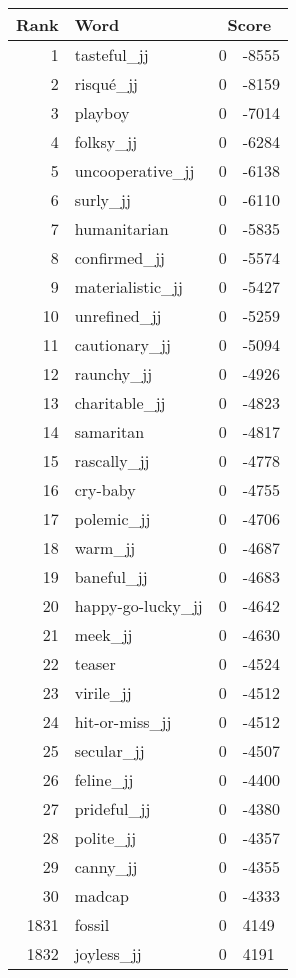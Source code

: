 \begin{longtable}[!htbp]{| rlr@{.}l |}
    \hline
    \textbf{Rank} & \textbf{Word} & \multicolumn{2}{c|}{\textbf{Score}} \\
    \hline
    \endhead
    1 & tasteful\_jj & 0 & -8555 \\
    2 & risqué\_jj & 0 & -8159 \\
    3 & playboy & 0 & -7014 \\
    4 & folksy\_jj & 0 & -6284 \\
    5 & uncooperative\_jj & 0 & -6138 \\
    6 & surly\_jj & 0 & -6110 \\
    7 & humanitarian & 0 & -5835 \\
    8 & confirmed\_jj & 0 & -5574 \\
    9 & materialistic\_jj & 0 & -5427 \\
    10 & unrefined\_jj & 0 & -5259 \\
    11 & cautionary\_jj & 0 & -5094 \\
    12 & raunchy\_jj & 0 & -4926 \\
    13 & charitable\_jj & 0 & -4823 \\
    14 & samaritan & 0 & -4817 \\
    15 & rascally\_jj & 0 & -4778 \\
    16 & cry-baby & 0 & -4755 \\
    17 & polemic\_jj & 0 & -4706 \\
    18 & warm\_jj & 0 & -4687 \\
    19 & baneful\_jj & 0 & -4683 \\
    20 & happy-go-lucky\_jj & 0 & -4642 \\
    21 & meek\_jj & 0 & -4630 \\
    22 & teaser & 0 & -4524 \\
    23 & virile\_jj & 0 & -4512 \\
    24 & hit-or-miss\_jj & 0 & -4512 \\
    25 & secular\_jj & 0 & -4507 \\
    26 & feline\_jj & 0 & -4400 \\
    27 & prideful\_jj & 0 & -4380 \\
    28 & polite\_jj & 0 & -4357 \\
    29 & canny\_jj & 0 & -4355 \\
    30 & madcap & 0 & -4333 \\
    1831 & fossil & 0 & 4149 \\
    1832 & joyless\_jj & 0 & 4191 \\

\end{longtable}
